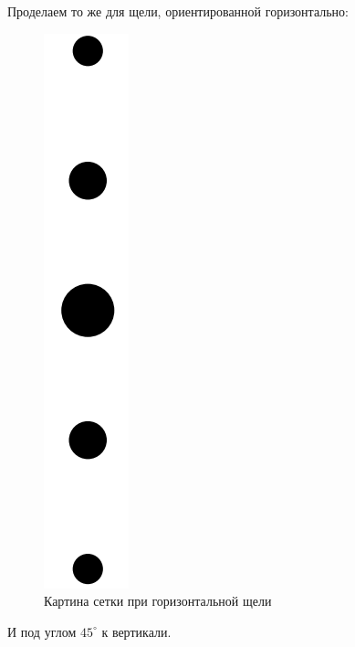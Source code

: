 \documentclass[a4paper,12pt]{article} %
\begin{document}
	\newpage
	Проделаем то же для щели, ориентированной горизонтально:
	
	\begin{figure}[h!]
		\centering
		\includegraphics[scale=0.65]{Pictures/Горизонт}
		\caption{Картина сетки при горизонтальной щели}
	\end{figure}

 	И под углом $45^\circ$ к вертикали.
 	
\end{document}

